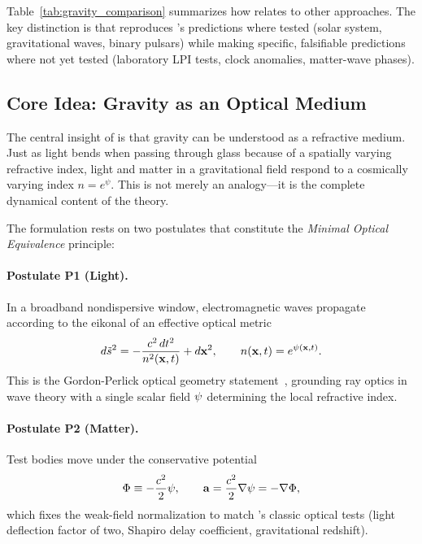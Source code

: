 Table~\ref{tab:gravity_comparison} summarizes how \DFD relates to other approaches. 
The key distinction is that \DFD reproduces \GR's predictions where tested 
(solar system, gravitational waves, binary pulsars) while making specific, 
falsifiable predictions where not yet tested (laboratory LPI tests, clock 
anomalies, matter-wave phases).

\subsection{Core Idea: Gravity as an Optical Medium}\label{sec:core_idea}

The central insight of \DFD is that gravity can be understood as a refractive 
medium. Just as light bends when passing through glass because of a spatially 
varying refractive index, light and matter in a gravitational field respond 
to a cosmically varying index $n = e^\psi$. This is not merely an analogy---it 
is the complete dynamical content of the theory.

The formulation rests on two postulates that constitute the 
\emph{Minimal Optical Equivalence} principle:

\paragraph{Postulate P1 (Light).}
In a broadband nondispersive window, electromagnetic waves propagate according 
to the eikonal of an effective optical metric
\begin{equation}
d\tilde{s}^2 = -\frac{c^2\,dt^2}{n^2(\mathbf{x},t)} + d\mathbf{x}^2, 
\qquad n(\mathbf{x},t) = e^{\psi(\mathbf{x},t)}.
\label{eq:optical_metric}
\end{equation}
This is the Gordon-Perlick optical geometry statement~\cite{Gordon1923,Perlick2000}, 
grounding ray optics in wave theory with a single scalar field $\psi$ 
determining the local refractive index.

\paragraph{Postulate P2 (Matter).}
Test bodies move under the conservative potential
\begin{equation}
\Phi \equiv -\frac{c^2}{2}\psi, 
\qquad \mathbf{a} = \frac{c^2}{2}\nabla\psi = -\nabla\Phi,
\label{eq:matter_response}
\end{equation}
which fixes the weak-field normalization to match \GR's classic optical tests 
(light deflection factor of two, Shapiro delay coefficient, gravitational redshift).

